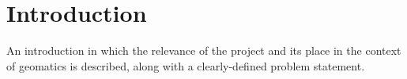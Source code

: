 \section{Introduction}
An introduction in which the relevance of the project and its place in the context of geomatics is described, along with a clearly-defined problem statement.